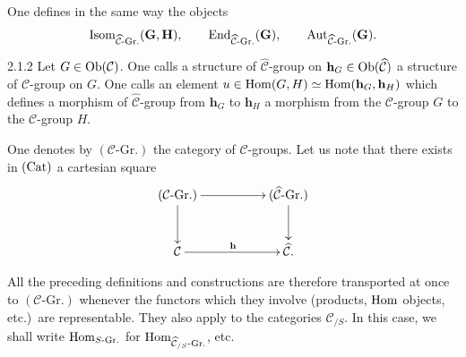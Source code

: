One defines in the same way the objects
\[
\operatorname{Isom}_{\widehat{\mathcal{C}}\text{-Gr.}}(\mathbf{G},\mathbf{H}),
\qquad
\operatorname{End}_{\widehat{\mathcal{C}}\text{-Gr.}}(\mathbf{G}),
\qquad
\operatorname{Aut}_{\widehat{\mathcal{C}}\text{-Gr.}}(\mathbf{G}).
\]

\begin{definition}{2.1.2}\label{I.2.1.2}
Let \(G\in\operatorname{Ob}(\mathcal{C})\). One calls a structure of
\(\widehat{\mathcal{C}}\)-group on
\(\mathbf{h}_{G}\in\operatorname{Ob}(\widehat{\mathcal{C}})\) a structure of
\(\mathcal{C}\)-group on \(G\). One calls an element
\(u\in\operatorname{Hom}(G,H)\simeq\operatorname{Hom}(\mathbf{h}_{G},\mathbf{h}_{H})\)
which defines a morphism of \(\widehat{\mathcal{C}}\)-group from
\(\mathbf{h}_{G}\) to \(\mathbf{h}_{H}\) a morphism from the
\(\mathcal{C}\)-group \(G\) to the \(\mathcal{C}\)-group \(H\).
\end{definition}

One denotes by \((\mathcal{C}\text{-Gr.})\) the category of
\(\mathcal{C}\)-groups. Let us note that there exists in \(\textup{(Cat)}\) a
cartesian square
\[
\xymatrix@C=18mm@R=10mm{
(\mathcal{C}\text{-Gr.}) \ar[r] \ar[d]
  & (\widehat{\mathcal{C}}\text{-Gr.}) \ar[d] \\
\mathcal{C} \ar[r]^{\mathbf{h}}
  & \widehat{\mathcal{C}}.
}
\]

All the preceding definitions and constructions are therefore transported at
once to \((\mathcal{C}\text{-Gr.})\) whenever the functors which they involve
(products, \(\operatorname{Hom}\) objects, etc.)\ are representable. They also apply to the
categories \(\mathcal{C}_{/S}\). In this case, we shall write
\(\operatorname{Hom}_{S\text{-Gr.}}\) for
\(\operatorname{Hom}_{\widehat{\mathcal{C}}_{/S}\text{-Gr.}}\), etc.

